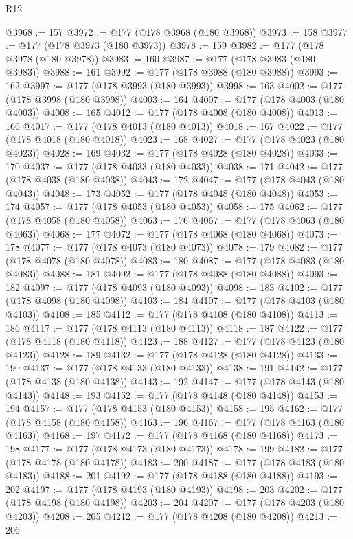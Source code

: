\begin{lexlean}{R12}
\begin{coremodule}
@3968 := 157
@3972 := @177 (@178 @3968 (@180 @3968))
@3973 := 158
@3977 := @177 (@178 @3973 (@180 @3973))
@3978 := 159
@3982 := @177 (@178 @3978 (@180 @3978))
@3983 := 160
@3987 := @177 (@178 @3983 (@180 @3983))
@3988 := 161
@3992 := @177 (@178 @3988 (@180 @3988))
@3993 := 162
@3997 := @177 (@178 @3993 (@180 @3993))
@3998 := 163
@4002 := @177 (@178 @3998 (@180 @3998))
@4003 := 164
@4007 := @177 (@178 @4003 (@180 @4003))
@4008 := 165
@4012 := @177 (@178 @4008 (@180 @4008))
@4013 := 166
@4017 := @177 (@178 @4013 (@180 @4013))
@4018 := 167
@4022 := @177 (@178 @4018 (@180 @4018))
@4023 := 168
@4027 := @177 (@178 @4023 (@180 @4023))
@4028 := 169
@4032 := @177 (@178 @4028 (@180 @4028))
@4033 := 170
@4037 := @177 (@178 @4033 (@180 @4033))
@4038 := 171
@4042 := @177 (@178 @4038 (@180 @4038))
@4043 := 172
@4047 := @177 (@178 @4043 (@180 @4043))
@4048 := 173
@4052 := @177 (@178 @4048 (@180 @4048))
@4053 := 174
@4057 := @177 (@178 @4053 (@180 @4053))
@4058 := 175
@4062 := @177 (@178 @4058 (@180 @4058))
@4063 := 176
@4067 := @177 (@178 @4063 (@180 @4063))
@4068 := 177
@4072 := @177 (@178 @4068 (@180 @4068))
@4073 := 178
@4077 := @177 (@178 @4073 (@180 @4073))
@4078 := 179
@4082 := @177 (@178 @4078 (@180 @4078))
@4083 := 180
@4087 := @177 (@178 @4083 (@180 @4083))
@4088 := 181
@4092 := @177 (@178 @4088 (@180 @4088))
@4093 := 182
@4097 := @177 (@178 @4093 (@180 @4093))
@4098 := 183
@4102 := @177 (@178 @4098 (@180 @4098))
@4103 := 184
@4107 := @177 (@178 @4103 (@180 @4103))
@4108 := 185
@4112 := @177 (@178 @4108 (@180 @4108))
@4113 := 186
@4117 := @177 (@178 @4113 (@180 @4113))
@4118 := 187
@4122 := @177 (@178 @4118 (@180 @4118))
@4123 := 188
@4127 := @177 (@178 @4123 (@180 @4123))
@4128 := 189
@4132 := @177 (@178 @4128 (@180 @4128))
@4133 := 190
@4137 := @177 (@178 @4133 (@180 @4133))
@4138 := 191
@4142 := @177 (@178 @4138 (@180 @4138))
@4143 := 192
@4147 := @177 (@178 @4143 (@180 @4143))
@4148 := 193
@4152 := @177 (@178 @4148 (@180 @4148))
@4153 := 194
@4157 := @177 (@178 @4153 (@180 @4153))
@4158 := 195
@4162 := @177 (@178 @4158 (@180 @4158))
@4163 := 196
@4167 := @177 (@178 @4163 (@180 @4163))
@4168 := 197
@4172 := @177 (@178 @4168 (@180 @4168))
@4173 := 198
@4177 := @177 (@178 @4173 (@180 @4173))
@4178 := 199
@4182 := @177 (@178 @4178 (@180 @4178))
@4183 := 200
@4187 := @177 (@178 @4183 (@180 @4183))
@4188 := 201
@4192 := @177 (@178 @4188 (@180 @4188))
@4193 := 202
@4197 := @177 (@178 @4193 (@180 @4193))
@4198 := 203
@4202 := @177 (@178 @4198 (@180 @4198))
@4203 := 204
@4207 := @177 (@178 @4203 (@180 @4203))
@4208 := 205
@4212 := @177 (@178 @4208 (@180 @4208))
@4213 := 206

\end{coremodule}
\end{lexlean}
